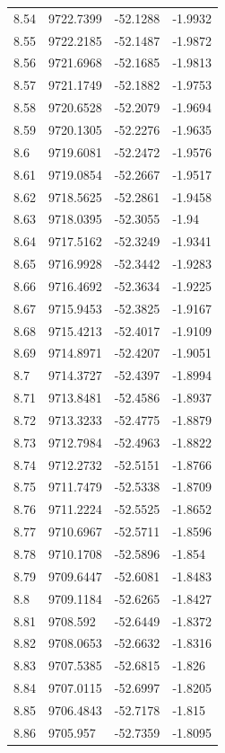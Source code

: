 \begin{table}[H]
\begin{tabular}{llll}
8.54 & 9722.7399 & -52.1288 & -1.9932 \\
8.55 & 9722.2185 & -52.1487 & -1.9872 \\
8.56 & 9721.6968 & -52.1685 & -1.9813 \\
8.57 & 9721.1749 & -52.1882 & -1.9753 \\
8.58 & 9720.6528 & -52.2079 & -1.9694 \\
8.59 & 9720.1305 & -52.2276 & -1.9635 \\
8.6 & 9719.6081 & -52.2472 & -1.9576 \\
8.61 & 9719.0854 & -52.2667 & -1.9517 \\
8.62 & 9718.5625 & -52.2861 & -1.9458 \\
8.63 & 9718.0395 & -52.3055 & -1.94 \\
8.64 & 9717.5162 & -52.3249 & -1.9341 \\
8.65 & 9716.9928 & -52.3442 & -1.9283 \\
8.66 & 9716.4692 & -52.3634 & -1.9225 \\
8.67 & 9715.9453 & -52.3825 & -1.9167 \\
8.68 & 9715.4213 & -52.4017 & -1.9109 \\
8.69 & 9714.8971 & -52.4207 & -1.9051 \\
8.7 & 9714.3727 & -52.4397 & -1.8994 \\
8.71 & 9713.8481 & -52.4586 & -1.8937 \\
8.72 & 9713.3233 & -52.4775 & -1.8879 \\
8.73 & 9712.7984 & -52.4963 & -1.8822 \\
8.74 & 9712.2732 & -52.5151 & -1.8766 \\
8.75 & 9711.7479 & -52.5338 & -1.8709 \\
8.76 & 9711.2224 & -52.5525 & -1.8652 \\
8.77 & 9710.6967 & -52.5711 & -1.8596 \\
8.78 & 9710.1708 & -52.5896 & -1.854 \\
8.79 & 9709.6447 & -52.6081 & -1.8483 \\
8.8 & 9709.1184 & -52.6265 & -1.8427 \\
8.81 & 9708.592 & -52.6449 & -1.8372 \\
8.82 & 9708.0653 & -52.6632 & -1.8316 \\
8.83 & 9707.5385 & -52.6815 & -1.826 \\
8.84 & 9707.0115 & -52.6997 & -1.8205 \\
8.85 & 9706.4843 & -52.7178 & -1.815 \\
8.86 & 9705.957 & -52.7359 & -1.8095 \\

\end{tabular}
\end{table}
